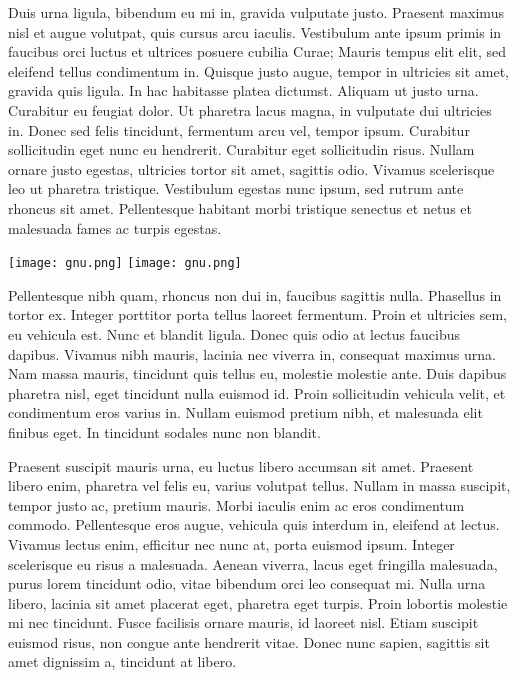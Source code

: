Duis urna ligula, bibendum eu mi in, gravida vulputate justo. Praesent maximus nisl et augue volutpat, quis cursus arcu iaculis. Vestibulum ante ipsum primis in faucibus orci luctus et ultrices posuere cubilia Curae; Mauris tempus elit elit, sed eleifend tellus condimentum in. Quisque justo augue, tempor in ultricies sit amet, gravida quis ligula. In hac habitasse platea dictumst. Aliquam ut justo urna. Curabitur eu feugiat dolor. Ut pharetra lacus magna, in vulputate dui ultricies in. Donec sed felis tincidunt, fermentum arcu vel, tempor ipsum. Curabitur sollicitudin eget nunc eu hendrerit. Curabitur eget sollicitudin risus. Nullam ornare justo egestas, ultricies tortor sit amet, sagittis odio. Vivamus scelerisque leo ut pharetra tristique. Vestibulum egestas nunc ipsum, sed rutrum ante rhoncus sit amet. Pellentesque habitant morbi tristique senectus et netus et malesuada fames ac turpis egestas.

\begin{center}
\texttt{[image: gnu.png]}
\texttt{[image: gnu.png]}
\end{center}



Pellentesque nibh quam, rhoncus non dui in, faucibus sagittis nulla. Phasellus in tortor ex. Integer porttitor porta tellus laoreet fermentum. Proin et ultricies sem, eu vehicula est. Nunc et blandit ligula. Donec quis odio at lectus faucibus dapibus. Vivamus nibh mauris, lacinia nec viverra in, consequat maximus urna. Nam massa mauris, tincidunt quis tellus eu, molestie molestie ante. Duis dapibus pharetra nisl, eget tincidunt nulla euismod id. Proin sollicitudin vehicula velit, et condimentum eros varius in. Nullam euismod pretium nibh, et malesuada elit finibus eget. In tincidunt sodales nunc non blandit.

Praesent suscipit mauris urna, eu luctus libero accumsan sit amet. Praesent libero enim, pharetra vel felis eu, varius volutpat tellus. Nullam in massa suscipit, tempor justo ac, pretium mauris. Morbi iaculis enim ac eros condimentum commodo. Pellentesque eros augue, vehicula quis interdum in, eleifend at lectus. Vivamus lectus enim, efficitur nec nunc at, porta euismod ipsum. Integer scelerisque eu risus a malesuada. Aenean viverra, lacus eget fringilla malesuada, purus lorem tincidunt odio, vitae bibendum orci leo consequat mi. Nulla urna libero, lacinia sit amet placerat eget, pharetra eget turpis. Proin lobortis molestie mi nec tincidunt. Fusce facilisis ornare mauris, id laoreet nisl. Etiam suscipit euismod risus, non congue ante hendrerit vitae. Donec nunc sapien, sagittis sit amet dignissim a, tincidunt at libero.

